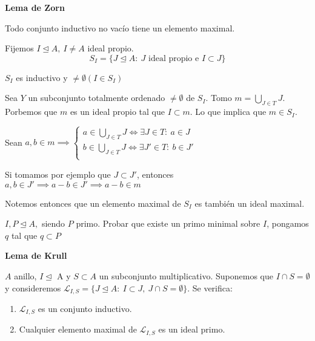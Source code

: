 \documentclass[openany]{book}
\begin{document}
\begin{lemma}
    \textbf{Lema de Zorn}

    Todo conjunto inductivo no vacío tiene un elemento maximal.
\end{lemma}

\begin{demonstration}
    Fijemos $ I  \trianglelefteq A,\ I \ne A $ ideal propio.
    $$ S_{I} = \{ J\trianglelefteq A:\ J \text{ ideal propio e }I \subset  J  \} $$

    $ S_{I} $ es inductivo y $ \ne \emptyset (I \in S_{I})$

    Sea $ Y $ un subconjunto totalmente ordenado $ \ne \emptyset $ de $ S_{I} $. Tomo $ m = \bigcup_{J \in T} J $. Porbemos que $ m $ es un ideal propio tal que $ I \subset  m $. Lo que implica que $ m \in S_{I} $.

    Sean $ a,b \in m \implies \left\{
    \begin{array}{l}
        a \in \bigcup_{J \in T}J \iff \exists J \in T:\ a \in J\\
        b \in \bigcup_{J \in T}J \iff \exists J' \in T:\ b \in J'\\
    \end{array}
    \right.
    $ 

    Si tomamos por ejemplo que $ J \subset  J' $, entonces $ a,b \in J' \implies a-b \in J' \implies a-b \in m $

    Notemos entonces que un elemento maximal de $ S_{I} $ es también un ideal maximal.
\end{demonstration}


\begin{exercise}
    $ I,P \unlhd A,   $ siendo $ P $ primo.  Probar que existe un primo minimal sobre $ I $, pongamos $ q $ tal que $ q \subset P $
\end{exercise}

\begin{lemma}
    \textbf{Lema de Krull}

    $ A $ anillo, $ I \unlhd $ A y $ S \subset A $ un subconjunto multiplicativo. Suponemos que $ I \cap S = \emptyset $ y consideremos $ \mathcal{L}_{I,S} = \{J \unlhd A:\ I \subset  J,\ J \cap S = \emptyset\} $. Se verifica:
    \begin{enumerate}
        \item $ \mathcal{L}_{I,S}  $ es un conjunto inductivo.
        \item Cualquier elemento maximal de $ \mathcal{L}_{I,S} $ es un ideal primo.
    \end{enumerate}

\end{lemma}
\end{document}

